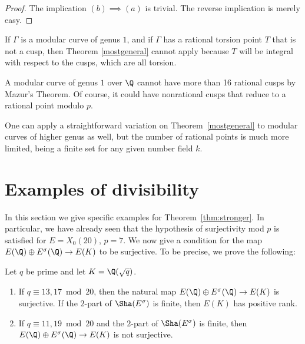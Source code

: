 \documentclass[12pt]{amsart}
\begin{document}
\begin{proof} The implication $(b)\implies(a)$ is trivial.  The reverse implication is merely easy. \end{proof}

\begin{rem}\label{cuspsandtorsion}
    If $\Gamma$ is a modular curve of genus $1$, and if $\Gamma$ has a rational torsion point $T$ that is not a cusp, then Theorem \ref{mostgeneral} cannot apply because $T$ will be integral with respect to the cusps, which are all torsion.
\end{rem}


\begin{rem}\label{numberofcusps}
    A modular curve of genus $1$ over $\Q$ cannot have more than 16 rational cusps by Mazur's Theorem.  Of course, it could have nonrational cusps that reduce to a rational point modulo $p$.
\end{rem}

\begin{rem}\label{highergenus}
    One can apply a straightforward variation on Theorem~\ref{mostgeneral} to modular curves of higher genus as well, but the number of rational points is much more limited, being a finite set for any given number field $k$.  
\end{rem}

\section{Examples of divisibility}
In this section we give specific examples for Theorem~\ref{thm:stronger}.  In particular,
we have already seen that the hypothesis of surjectivity mod $p$ is satisfied for $E = X_0(20)$,
$p = 7$.  We now give a condition for the map $E(\Q) \oplus E^\sigma(\Q) \to E(K)$ to be 
surjective.  To be precise, we prove the following:

\begin{thm}\label{thm:surjectivity}
Let $q$ be prime and let $K = \Q(\sqrt{q})$.
\begin{enumerate} 
\item If $q \equiv 13, 17 \bmod 20$, then the natural map 
$E(\Q) \oplus E^\sigma(\Q) \to E(K)$ is surjective.  If the $2$-part of $\Sha(E^\sigma)$ is finite, 
then $E(K)$ has positive rank.
\item If $q \equiv 11, 19 \bmod 20$ and the $2$-part of $\Sha(E^\sigma)$ 
is finite, then $E(\Q) \oplus E^\sigma(\Q) \to E(K)$ is not surjective.
\end{enumerate}
\end{thm}
\end{document}
